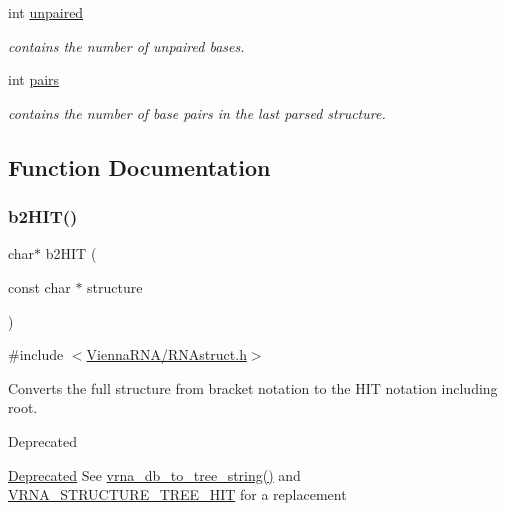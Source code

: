 \begin{DoxyCompactItemize}
int \hyperlink{group__struct__utils__deprecated_gadd2f952597e02d66e1116a9d11d252d6}{unpaired}
\begin{DoxyCompactList}\small\item\em contains the number of unpaired bases. \end{DoxyCompactList}\item 
\mbox{\label{group__struct__utils__deprecated_ga6341cbb704924824e0236c1dce791032}} 
int \hyperlink{group__struct__utils__deprecated_ga6341cbb704924824e0236c1dce791032}{pairs}
\begin{DoxyCompactList}\small\item\em contains the number of base pairs in the last parsed structure. \end{DoxyCompactList}\end{DoxyCompactItemize}


\subsection{Function Documentation}
\mbox{\label{group__struct__utils__deprecated_ga07b7e90e712559a1992fba3ac6d21bbd}} 
\subsubsection{\texorpdfstring{b2\+H\+I\+T()}{b2HIT()}}
{\footnotesize\ttfamily char$\ast$ b2\+H\+IT (\begin{DoxyParamCaption}\item[{const char $\ast$}]{structure }\end{DoxyParamCaption})}



{\ttfamily \#include $<$\hyperlink{RNAstruct_8h}{Vienna\+R\+N\+A/\+R\+N\+Astruct.\+h}$>$}



Converts the full structure from bracket notation to the H\+IT notation including root. 

\begin{DoxyRefDesc}{Deprecated}
\item[\hyperlink{deprecated__deprecated000126}{Deprecated}]See \hyperlink{group__struct__utils__tree_ga56551ab7da64933a7230d29430f40cfe}{vrna\+\_\+db\+\_\+to\+\_\+tree\+\_\+string()} and \hyperlink{group__struct__utils__tree_ga3ad5609bc93ef20034c3ab989365c1f0}{V\+R\+N\+A\+\_\+\+S\+T\+R\+U\+C\+T\+U\+R\+E\+\_\+\+T\+R\+E\+E\+\_\+\+H\+IT} for a replacement\end{DoxyRefDesc}



